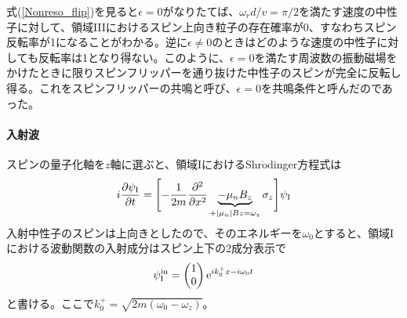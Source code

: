 式(\ref{Nonreso_flip})を見ると$\epsilon=0$がなりたてば、$\omega_rd/v=\pi/2$を満たす速度の中性子に対して、領域IIIにおけるスピン上向き粒子の存在確率が0、すなわちスピン反転率が1になることがわかる。逆に$\epsilon \neq 0$のときはどのような速度の中性子に対しても反転率は1となり得ない。このように、$\epsilon=0$を満たす周波数の振動磁場をかけたときに限りスピンフリッパーを通り抜けた中性子のスピンが完全に反転し得る。これをスピンフリッパーの共鳴と呼び、$\epsilon=0$を共鳴条件と呼んだのであった。

\renewcommand{\arraystretch}{1.5}

\paragraph{入射波}
スピンの量子化軸を$z$軸に選ぶと、領域IにおけるShr$\ddot{\mathrm{o}}$dinger方程式は%
\begin{equation}
i\frac{\partial \psi_\mathrm{I}}{\partial t}= \Biggl[-\frac{1}{2m} \frac{\partial^2}{\partial x^2} \underbrace{-\mu_nB_z}_{+|\mu_n|Bz =\omega_z} \sigma_z\Biggr] \psi_\mathrm{I}
\end{equation}
入射中性子のスピンは上向きとしたので、そのエネルギーを$\omega_0$とすると、領域Iにおける波動関数の入射成分はスピン上下の2成分表示で
\begin{equation}
\psi_\mathrm{I}^{\mathrm{in}}=\begin{pmatrix} 1\\0 \end{pmatrix} \mathrm{e}^{i k_0^+ x -i\omega_0 t}
\end{equation}
と書ける。ここで$k_0^+=\sqrt{2m(\omega_0 -\omega_z)}$。
\renewcommand{\arraystretch}{1}

